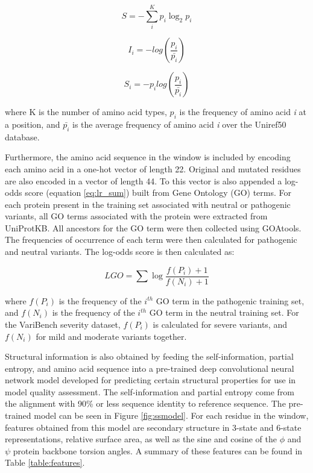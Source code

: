 \documentclass[11pt]{article}
\begin{document}
\begin{equation} \label{eq:shannon}
S = -\sum_{i}^{K} p_i \log_2 p_i
\end{equation}

\begin{equation} \label{eq:self_info}
I_i = -log(\frac{p_i}{\bar{p_i}})
\end{equation}

\begin{equation} \label{eq:part_entr}
S_i = -p_i log(\frac{p_i}{\bar{p_i}})
\end{equation}

where K is the number of amino acid types, $p_i$ is the frequency of amino acid \textit{i} at a position, and $\bar{p_i}$ is the average frequency of amino acid \textit{i} over the Uniref50 database.

Furthermore, the amino acid sequence in the window is included by encoding each amino acid in a one-hot vector of length 22. Original and mutated residues are also encoded in a vector of length 44. To this vector is also appended a log-odds score (equation \ref{eq:lr_sum}) built from Gene Ontology (GO) terms. For each protein present in the training set associated with neutral or pathogenic variants, all GO terms associated with the protein were extracted from UniProtKB. All ancestors for the GO term were then collected using GOAtools\cite{tang2015goatools}. The frequencies of occurrence of each term were then calculated for pathogenic and neutral variants. The log-odds score is then calculated as:

\begin{equation} \label{eq:lr_sum}
LGO = \sum\log\frac{f(P_i)+1}{{f(N_i)+1}}
\end{equation}

where $f(P_i)$ is the frequency of the $i^{th}$ GO term in the pathogenic training set, and $f(N_i)$ is the frequency of the $i^{th}$ GO term in the neutral training set. For the VariBench severity dataset, $f(P_i)$ is calculated for severe variants, and $f(N_i)$ for mild and moderate variants together.

Structural information is also obtained by feeding the self-information, partial entropy, and amino acid sequence into a pre-trained deep convolutional neural network model developed for predicting certain structural properties for use in model quality assessment\cite{hurtado2018deep}. The self-information and partial entropy come from the alignment with 90\% or less sequence identity to reference sequence. The pre-trained model can be seen in Figure \ref{fig:ssmodel}. For each residue in the window, features obtained from this model are secondary structure in 3-state and 6-state representations, relative surface area, as well as the sine and cosine of the $\phi$ and $\psi$ protein backbone torsion angles\cite{xue2008real}. A summary of these features can be found in Table \ref{table:features}.
\end{document}
